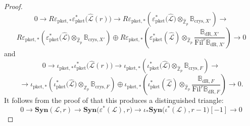 \documentclass[asterisque,english]{smfart}
\begin{document}
\begin{proof}
$$0 \to R\varepsilon_{\mathrm{pket},\ast} \varepsilon_{\mathrm{pket}}^\ast\bigl(\widehat{\mathcal{L}}(r) \bigr)  \longrightarrow R\varepsilon_{\mathrm{pket},\ast}\left( \varepsilon_{\mathrm{pket}}^\ast\bigl(\widehat{\mathcal{L}}\bigr)\otimes_{\widehat{\mathbb{Z}}_p}  \mathbb{B}_{\mathrm{crys},X'}\right) \longrightarrow $$ $$ R\varepsilon_{\mathrm{pket},\ast}\left( \varepsilon_{\mathrm{pket}}^\ast\bigl(\widehat{\mathcal{L}}\bigr)\otimes_{\widehat{\mathbb{Z}}_p}  \mathbb{B}_{\mathrm{crys},X'}\right) \oplus R\varepsilon_{\mathrm{pket},\ast}\left(\varepsilon_{\mathrm{pket}}^\ast( \widehat{\mathcal{L}})\otimes_{\widehat{\mathbb{Z}}_p} \frac{\mathbb{B}_{\mathrm{dR},X'}}{\mathrm{Fil}^r\mathbb{B}_{\mathrm{dR},X'} }\right) \longrightarrow 0$$and 
$$ 0 \to \iota_{\mathrm{pket},\ast} \iota_{\mathrm{pket}}^\ast\bigl(\widehat{\mathcal{L}}(r) \bigr)  \longrightarrow  \iota_{\mathrm{pket},\ast}\left( \iota_{\mathrm{pket}}^\ast\bigl(\widehat{\mathcal{L}}\bigr)\otimes_{\widehat{\mathbb{Z}}_p}  \mathbb{B}_{\mathrm{crys},F}\right)\longrightarrow   $$ $$ {\longrightarrow} \iota_{\mathrm{pket},\ast}\left( \iota_{\mathrm{pket}}^\ast\bigl(\widehat{\mathcal{L}}\bigr)\otimes_{\widehat{\mathbb{Z}}_p}  \mathbb{B}_{\mathrm{crys},F}\right)\oplus \iota_{\mathrm{pket},\ast}\left(\iota_{\mathrm{pket}}^\ast( \widehat{\mathcal{L}})\otimes_{\widehat{\mathbb{Z}}_p}\frac{\mathbb{B}_{\mathrm{dR},F}}{\mathrm{Fil}^r\mathbb{B}_{\mathrm{dR},F} }\right)  \longrightarrow 0.$$It follows from the proof of \cite[Prop. 4.3.17]{LLZ} that this  produces a distinguished triangle:
$$0\longrightarrow \mathbf{Syn}(\mathcal{L},r) \longrightarrow \mathbf{Syn}\bigl(\varepsilon^\ast(\mathcal{L}),r\bigr) \longrightarrow \iota_\ast  \mathbf{Syn}\bigl(\iota^\ast(\mathcal{L}),r-1\bigr)[-1]  \longrightarrow 0  $$

\end{proof}
\end{document}
